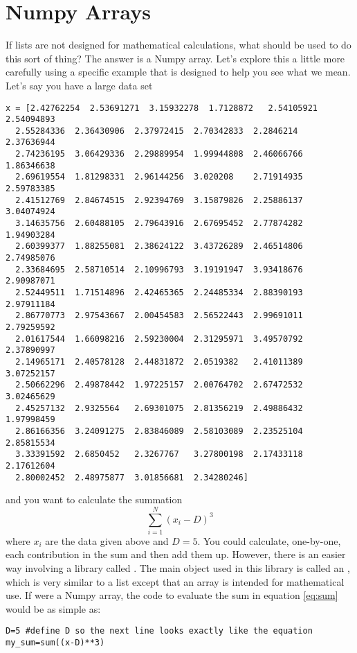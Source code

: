 \section{Numpy Arrays}
If lists are not designed for mathematical calculations, what should
be used to do this sort of thing?  The answer is a Numpy array. Let's
explore this a little more carefully using a specific example that is
designed to help you see what we mean.  Let's say
you have a large data set
\begin{Verbatim}
x = [2.42762254  2.53691271  3.15932278  1.7128872   2.54105921  2.54094893
  2.55284336  2.36430906  2.37972415  2.70342833  2.2846214   2.37636944
  2.74236195  3.06429336  2.29889954  1.99944808  2.46066766  1.86346638
  2.69619554  1.81298331  2.96144256  3.020208    2.71914935  2.59783385
  2.41512769  2.84674515  2.92394769  3.15879826  2.25886137  3.04074924
  3.14635756  2.60488105  2.79643916  2.67695452  2.77874282  1.94903284
  2.60399377  1.88255081  2.38624122  3.43726289  2.46514806  2.74985076
  2.33684695  2.58710514  2.10996793  3.19191947  3.93418676  2.90987071
  2.52449511  1.71514896  2.42465365  2.24485334  2.88390193  2.97911184
  2.86770773  2.97543667  2.00454583  2.56522443  2.99691011  2.79259592
  2.01617544  1.66098216  2.59230004  2.31295971  3.49570792  2.37890997
  2.14965171  2.40578128  2.44831872  2.0519382   2.41011389  3.07252157
  2.50662296  2.49878442  1.97225157  2.00764702  2.67472532  3.02465629
  2.45257132  2.9325564   2.69301075  2.81356219  2.49886432  1.97998459
  2.86166356  3.24091275  2.83846089  2.58103089  2.23525104  2.85815534
  3.33391592  2.6850452   2.3267767   3.27800198  2.17433118  2.17612604
  2.80002452  2.48975877  3.01856681  2.34280246]
\end{Verbatim}
and you want to calculate the summation
\begin{equation}\label{eq:sum}
\sum_{i=1}^N (x_i - D)^3
\end{equation}
where $x_i$ are the data given above and $D = 5$.  You could
calculate, one-by-one, each contribution in the sum and then add them
up.  However, there is an easier way involving
a library called  .  The main object used in this library
is called an , which is very similar to a list except that
an array is intended for mathematical use.  If  were a Numpy
array, the code to evaluate the sum in equation \ref{eq:sum} would be
as simple as:
\begin{Verbatim}
D=5 #define D so the next line looks exactly like the equation
my_sum=sum((x-D)**3)
\end{Verbatim}

